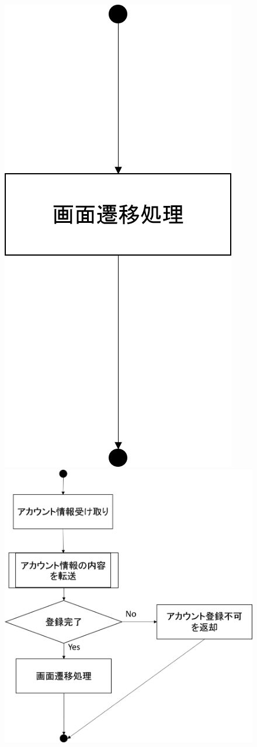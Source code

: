 \begin{figure}[htbp]
 \begin{minipage}{0.5\hsize}
  \begin{center}
   \includegraphics[width=0.5\linewidth,clip]{./img/create_account/sub1.png}
  \end{center}
 \end{minipage}
 \begin{minipage}{0.5\hsize}
  \begin{center}
   \includegraphics[width=1\linewidth,clip]{./img/create_account/sub2.png}

\end{center}
\end{minipage}
\end{figure}
